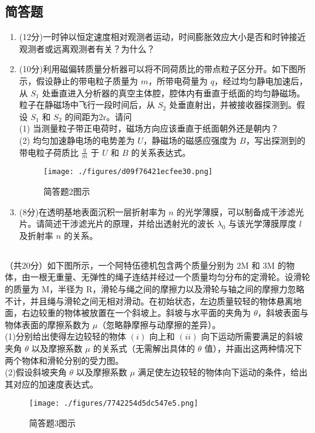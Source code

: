 \subsection{简答题}
\begin{enumerate}
\item (12分)一时钟以恒定速度相对观测者运动，时间膨胀效应大小是否和时钟接近观测者或远离观测者有关？为什么？
\item (10分)利用磁偏转质量分析器可以将不同荷质比的带点粒子区分开。如下图所示，假设静止的带电粒子质量为 $m$，所带电荷量为 $q$，经过均匀静电加速后，从 $S_{1}$ 处垂直进入分析器的真空主体腔，腔体内有垂直于纸面的均匀静磁场。粒子在静磁场中飞行一段时间后，从 $S_{2}$ 处垂直射出，并被接收器探测到。假设 $S_{1}$ 和 $S_{2}$ 的间距为2r。请问\\
(1) 当测量粒子带正电荷时，磁场方向应该垂直于纸面朝外还是朝内？\\
(2) 均匀加速静电场的电势差为 $U$，静磁场的磁感应强度为 $B$，写出探测到的带电粒子荷质比 $\frac{q}{m}$ 于 $U$ 和 $B$ 的关系表达式。\\
\begin{figure}[ht]
\centering
\texttt{[image: ./figures/d09f76421ecfee30.png]}
\caption{简答题2图示} \label{fig_CAS17_3}
\end{figure}
\item (8分)在透明基地表面沉积一层折射率为 $n$ 的光学薄膜，可以制备成干涉滤光片。请简述干涉滤光片的原理，并给出透射光的波长 $\lambda_{0}$ 与该光学薄膜厚度 $l$ 及折射率 $n$ 的关系。
\end{enumerate}
\subsection{ }
（共20分）如下图所示，一个阿特伍德机包含两个质量分别为 $2\mathrm{M}$ 和 $3\mathrm{M}$ 的物体，由一根无重量、无弹性的绳子连结并经过一个质量均匀分布的定滑轮。设滑轮的质量为 $\mathrm{M}$，半径为 $\mathrm{R}$，滑轮与绳之间的摩擦力以及滑轮与轴之间的摩擦力忽略不计，并且绳与滑轮之间无相对滑动。在初始状态，左边质量较轻的物体悬离地面，右边较重的物体被放置在一个斜坡上。斜坡与水平面的夹角为 $\theta$，斜坡表面与物体表面的摩擦系数为 $\mu$（忽略静摩擦与动摩擦的差异）。\\
(1)分别给出使得左边较轻的物体 $(i)$ 向上和 $(ii)$ 向下运动所需要满足的斜坡夹角 $\theta$ 以及摩擦系数 $\mu$ 的关系式（无需解出具体的 $\theta$ 值），并画出这两种情况下两个物体和滑轮分别的受力图。\\
(2)假设斜坡夹角 $\theta$ 以及摩擦系数 $\mu$ 满足使左边较轻的物体向下运动的条件，给出其对应的加速度表达式。\\
\begin{figure}[ht]
\centering
\texttt{[image: ./figures/7742254d5dc547e5.png]}
\caption{简答题3图示} \label{fig_CAS17_4}
\end{figure}
